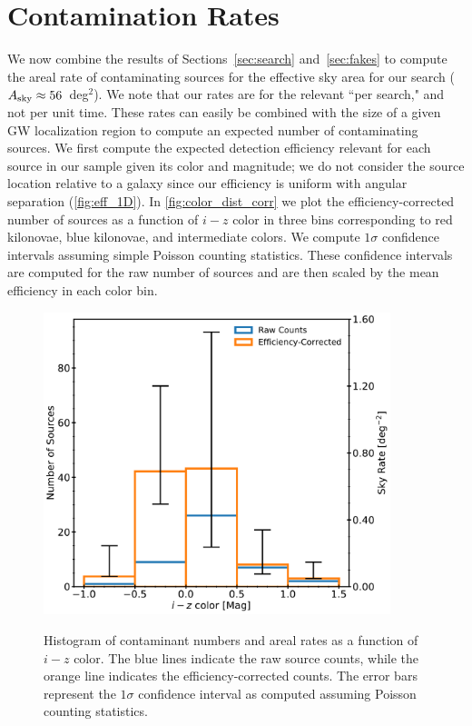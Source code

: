 \section{Contamination Rates}
\label{sec:contam_rates}
We now combine the results of Sections~\ref{sec:search} and~\ref{sec:fakes} to compute the areal rate of contaminating sources for the effective sky area for our search ($A_{\rm sky} \approx56$~deg$^2$). We note that our rates are for the relevant ``per search," and not per unit time. These rates can easily be combined with the size of a given GW localization region to compute an expected number of contaminating sources. We first compute the expected detection efficiency relevant for each source in our sample given its color and magnitude; we do not consider the source location relative to a galaxy since our efficiency is uniform with angular separation (\autoref{fig:eff_1D}). In \autoref{fig:color_dist_corr} we plot the efficiency-corrected number of sources as a function of $i-z$ color in three bins corresponding to red kilonovae, blue kilonovae, and intermediate colors. We compute $1\sigma$ confidence intervals assuming simple Poisson counting statistics. These confidence intervals are computed for the raw number of sources and are then scaled by the mean efficiency in each color bin.

\begin{figure}[!t]
\begin{center}
\hspace*{-0.1in} 
\scalebox{1.}
{\includegraphics[width=0.9\textwidth]{./figs/chapter3/f8.pdf}}
\caption{Histogram of contaminant numbers and areal rates as a function of $i-z$ color. The blue lines indicate the raw source counts, while the orange line indicates the efficiency-corrected counts. The error bars represent the $1\sigma$ confidence interval as computed assuming Poisson counting statistics.}
\label{fig:color_dist_corr}
\end{center}
\end{figure}

